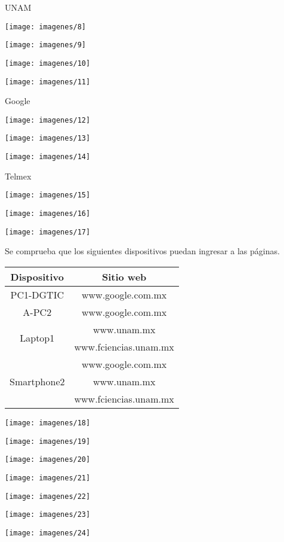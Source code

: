 \documentclass{article}
\begin{document}
\begin{center}
UNAM

\texttt{[image: imagenes/8]}

\texttt{[image: imagenes/9]}

\texttt{[image: imagenes/10]}

\texttt{[image: imagenes/11]}

Google

\texttt{[image: imagenes/12]}

\texttt{[image: imagenes/13]}

\texttt{[image: imagenes/14]}

Telmex

\texttt{[image: imagenes/15]}

\texttt{[image: imagenes/16]}

\texttt{[image: imagenes/17]}

\end{center}

Se comprueba que los siguientes dispositivos puedan ingresar a las páginas.

\begin{center}
\begin{tabular}{|c|c|}
\hline
\textbf{Dispositivo} & \textbf{Sitio web} \\ \hline
PC1-DGTIC & www.google.com.mx \\ \hline
A-PC2 & www.google.com.mx \\ \hline
\multirow{2}{*}{Laptop1} & www.unam.mx \\
& www.fciencias.unam.mx\\ \hline
\multirow{3}{*}{Smartphone2} & www.google.com.mx \\
& www.unam.mx \\
& www.fciencias.unam.mx \\ \hline
\end{tabular}
\end{center}

\begin{center}
\texttt{[image: imagenes/18]}

\texttt{[image: imagenes/19]}

\texttt{[image: imagenes/20]}

\texttt{[image: imagenes/21]}

\texttt{[image: imagenes/22]}

\texttt{[image: imagenes/23]}

\texttt{[image: imagenes/24]}
\end{center}
\end{document}
